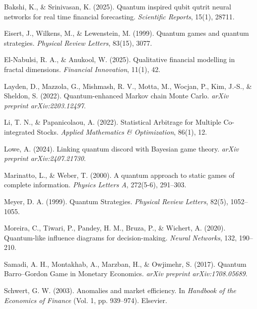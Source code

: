 \begin{thebibliography}{} 

Bakshi, K., \& Srinivasan, K. (2025). Quantum inspired qubit qutrit neural networks for real time financial forecasting. \textit{Scientific Reports}, 15(1), 28711.

Eisert, J., Wilkens, M., \& Lewenstein, M. (1999). Quantum games and quantum strategies. \textit{Physical Review Letters}, 83(15), 3077.

El-Nabulsi, R. A., \& Anukool, W. (2025). Qualitative financial modelling in fractal dimensions. \textit{Financial Innovation}, 11(1), 42.

Layden, D., Mazzola, G., Mishmash, R. V., Motta, M., Wocjan, P., Kim, J.-S., \& Sheldon, S. (2022). Quantum-enhanced Markov chain Monte Carlo. \textit{arXiv preprint arXiv:2203.12497}.

Li, T. N., \& Papanicolaou, A. (2022). Statistical Arbitrage for Multiple Co-integrated Stocks. \textit{Applied Mathematics \& Optimization}, 86(1), 12.

Lowe, A. (2024). Linking quantum discord with Bayesian game theory. \textit{arXiv preprint arXiv:2407.21730}.

Marinatto, L., \& Weber, T. (2000). A quantum approach to static games of complete information. \textit{Physics Letters A}, 272(5-6), 291--303.

Meyer, D. A. (1999). Quantum Strategies. \textit{Physical Review Letters}, 82(5), 1052--1055.

Moreira, C., Tiwari, P., Pandey, H. M., Bruza, P., \& Wichert, A. (2020). Quantum-like influence diagrams for decision-making. \textit{Neural Networks}, 132, 190--210.

Samadi, A. H., Montakhab, A., Marzban, H., \& Owjimehr, S. (2017). Quantum Barro–Gordon Game in Monetary Economics. \textit{arXiv preprint arXiv:1708.05689}.

Schwert, G. W. (2003). Anomalies and market efficiency. In \textit{Handbook of the Economics of Finance} (Vol. 1, pp. 939--974). Elsevier.


\end{thebibliography}
